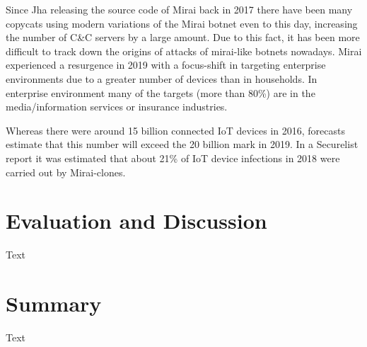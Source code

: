 Since Jha releasing the source code of Mirai back in 2017 there have been many copycats using modern variations of the Mirai botnet even to this day, increasing the number of C\&C servers by a large amount. Due to this fact, it has been more difficult to track down the origins of attacks of mirai-like botnets nowadays.
Mirai experienced a resurgence in 2019 with a focus-shift in targeting enterprise environments due to a greater number of devices than in households. In enterprise environment many of the targets (more than 80\%) are in the media/information services or insurance industries.

Whereas there were around 15 billion connected IoT devices in 2016, forecasts estimate that this number will exceed the 20 billion mark in 2019. In a Securelist report it was estimated that about 21\% of IoT device infections in 2018 were carried out by Mirai-clones.



\section{Evaluation and Discussion}
Text

\section{Summary}
Text
